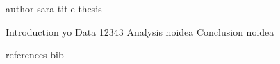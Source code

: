 author  sara
title  thesis

Introduction  yo
Data  12343
Analysis  noidea
Conclusion noidea

references  bib 

